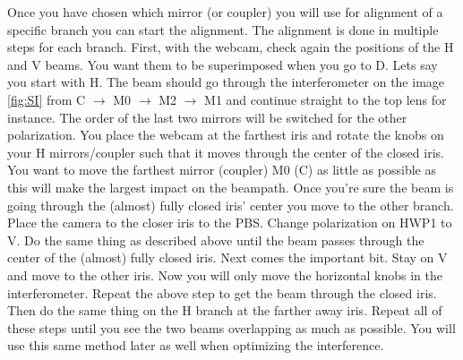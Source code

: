 Once you have chosen which mirror (or coupler) you will use for alignment of a specific branch you can start the alignment.
The alignment is done in multiple steps for each branch. First, with the webcam, check again the positions of the H and V beams. You want them to be superimposed when you go to D. 
Lets say you start with H. The beam should go through the interferometer on the image \ref{fig:SI} from C $\rightarrow$ M0 $\rightarrow$ M2 $\rightarrow$ M1 and 
continue straight to the top lens for instance. The order of the last two mirrors will be switched for the other polarization. 
You place the webcam at the farthest iris and rotate the knobs on your H mirrors/coupler such that it moves through the center of the closed iris.
You want to move the farthest mirror (coupler) M0 (C) as little as possible as this will make the largest impact on the beampath.
Once you're sure the beam is going through the (almost) fully closed iris' center you move to the other branch.
Place the camera to the closer iris to the PBS. Change polarization on HWP1 to V. Do the same thing as described above until the beam passes through the center of the (almost) fully closed iris.
Next comes the important bit. Stay on V and move to the other iris. Now you will only move the horizontal knobs in the interferometer. Repeat the above step to get the beam through the closed iris. 
Then do the same thing on the H branch at the farther away iris. Repeat all of these steps until you see the two beams overlapping as much as possible. You will use this same method later as well when
optimizing the interference.
